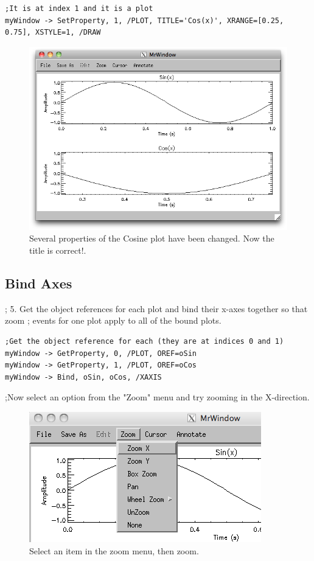 \documentclass[12pt, letterpaper, oneside]{article}		%
\begin{document}
\begin{lstlisting}
;It is at index 1 and it is a plot
myWindow -> SetProperty, 1, /PLOT, TITLE='Cos(x)', XRANGE=[0.25, 0.75], XSTYLE=1, /DRAW
\end{lstlisting}

\begin{figure}[h!]
  \centering
  \includegraphics[width=0.75 \textwidth]{./figures/Sine-Cosine-Correct-Title.png}
  \caption[Title Change.]
   {Several properties of the Cosine plot have been changed. Now the title is correct!.}
\end{figure}

\subsection{Bind Axes}
; 5. Get the object references for each plot and bind their x-axes together so that zoom
;    events for one plot apply to all of the bound plots.
   
\begin{lstlisting}
;Get the object reference for each (they are at indices 0 and 1)
myWindow -> GetProperty, 0, /PLOT, OREF=oSin
myWindow -> GetProperty, 1, /PLOT, OREF=oCos
myWindow -> Bind, oSin, oCos, /XAXIS
\end{lstlisting}
    
    ;Now select an option from the "Zoom" menu and try zooming in the X-direction.

\begin{figure}[h!]
	\centering
	\includegraphics[width=0.75 \textwidth]{./figures/Zoom-Menu.png}
	\caption[Zoom Menu.]
	{Select an item in the zoom menu, then zoom.}
\end{figure}
\end{document}
